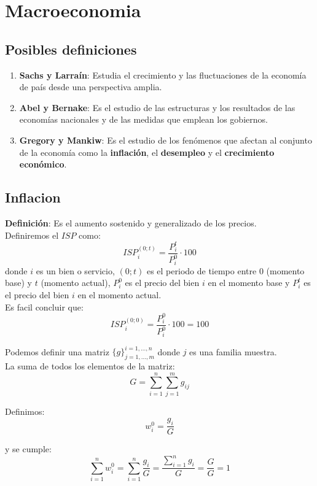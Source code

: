 \documentclass{report}
\begin{document}
\chapter{Macroeconomia}

\section{Posibles definiciones}

\begin{enumerate}
	\item \textbf{Sachs y Larraín}: Estudia el crecimiento y las fluctuaciones de la economía de país desde una perspectiva amplia.
	\item \textbf{Abel y Bernake}: Es el estudio de las estructuras y los resultados de las economías nacionales y de las medidas que emplean los gobiernos.
	\item \textbf{Gregory y Mankiw}: Es el estudio de los fenómenos que afectan al conjunto de la economía como la \textbf{inflación}, el \textbf{desempleo} y el \textbf{crecimiento económico}.
\end{enumerate}

\section{Inflacion}
\textbf{Definición}: Es el aumento sostenido y generalizado de los precios. \\

Definiremos el \(ISP\) como:
\[\boxed{ISP_i^{(0;t)}= \frac{P_i^t}{P_i^0} \cdot 100}\]
donde \(i\) es un bien o servicio, \((0;t)\) es el periodo de tiempo entre \(0\) (momento base) y \(t\) (momento actual), \(P_i^0\) es el precio del bien \(i\) en el momento base y \(P_i^t\) es el precio del bien \(i\) en el momento actual. \\

Es facil concluir que:
\[ISP_i^{(0;0)}= \frac{P_i^0}{P_i^0} \cdot 100=100\]


Podemos definir una matriz \(\{ g \}^{i=1,...,n}_{j=1,...,m}\)
donde $j$ es una familia muestra. \\

La suma de todos los elementos de la matriz:
\[
	G=
	\sum_{i=1}^{n}{\sum_{j=1}^m{{g_{ij}}}}
\]

Definimos:
\[
	w_i^0=
	\frac{g_i}{G}
\]

y se cumple:
\[
	\sum_{i=1}^{n}{w_i^0}=
	\sum_{i=1}^{n}{\frac{g_i}{G}}=
	\frac{\sum_{i=1}^{n}{g_i}}{G}=
	\frac{G}{G}
	=1
\]
\end{document}
